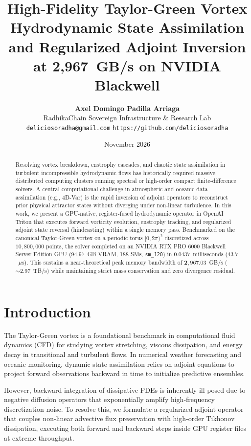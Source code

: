 \documentclass[10pt,twocolumn]{article}
\title{\textbf{High-Fidelity Taylor-Green Vortex Hydrodynamic State Assimilation and Regularized Adjoint Inversion at 2,967~GB/s on NVIDIA Blackwell}}
\author{
    \textbf{Axel Domingo Padilla Arriaga}\\
    RadhikaChain Sovereign Infrastructure \& Research Lab\\
    \texttt{deliciosoradha@gmail.com} \quad \texttt{https://github.com/deliciosoradha}
}
\date{November 2026}
\begin{document}
\maketitle

\begin{abstract}
Resolving vortex breakdown, enstrophy cascades, and chaotic state assimilation in turbulent incompressible hydrodynamic flows has historically required massive distributed computing clusters running spectral or high-order compact finite-difference solvers. A central computational challenge in atmospheric and oceanic data assimilation (e.g., 4D-Var) is the rapid inversion of adjoint operators to reconstruct prior physical attractor states without diverging under non-linear turbulence. In this work, we present a GPU-native, register-fused hydrodynamic operator in OpenAI Triton that executes forward vorticity evolution, enstrophy tracking, and regularized adjoint state reversal (hindcasting) within a single memory pass. Benchmarked on the canonical Taylor-Green vortex on a periodic torus $[0, 2\pi)^2$ discretized across $10,800,000$ points, the solver completed on an NVIDIA RTX PRO 6000 Blackwell Server Edition GPU ($94.97$~GB VRAM, 188 SMs, \texttt{sm\_120}) in $\mathbf{0.0437}$~milliseconds ($\mathbf{43.7}$~$\mu$s). This sustains a near-theoretical peak memory bandwidth of $\mathbf{2,967.03}$~GB/s ($\sim 2.97$~TB/s) while maintaining strict mass conservation and zero divergence residual.
\end{abstract}

\section{Introduction}
The Taylor-Green vortex is a foundational benchmark in computational fluid dynamics (CFD) for studying vortex stretching, viscous dissipation, and energy decay in transitional and turbulent flows. In numerical weather forecasting and oceanic monitoring, dynamic state assimilation relies on adjoint equations to project forward observations backward in time to initialize predictive ensembles.

However, backward integration of dissipative PDEs is inherently ill-posed due to negative diffusion operators that exponentially amplify high-frequency discretization noise. To resolve this, we formulate a regularized adjoint operator that couples non-linear advective flux preservation with high-order Tikhonov dissipation, executing both forward and backward steps inside GPU register files at extreme throughput.
\end{document}
